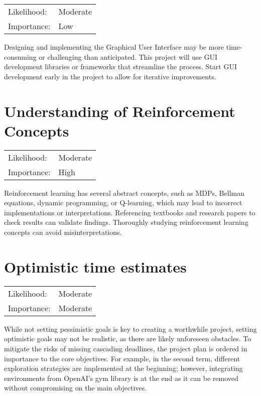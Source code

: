 \documentclass[]{final_report}
\begin{document}
\begin{center}
    \begin{tabular}{l l  }
    Likelihood: & Moderate \\
    Importance: & Low \\
    \end{tabular}
  \end{center}

Designing and implementing the Graphical User Interface may be more time-consuming or challenging than anticipated. This project will use GUI development libraries or frameworks that streamline the process. Start GUI development early in the project to allow for iterative improvements.

\section{Understanding of Reinforcement Concepts}

\begin{center}
    \begin{tabular}{l l  }
    Likelihood: & Moderate \\
    Importance: & High \\
    \end{tabular}
  \end{center}

Reinforcement learning has several abstract concepts, such as MDPs, Bellman equations, dynamic programming, or Q-learning, which may lead to incorrect implementations or interpretations. Referencing textbooks and research papers to check results can validate findings. Thoroughly studying reinforcement learning concepts can avoid misinterpretations.

\section{Optimistic time estimates}

\begin{center}
    \begin{tabular}{l l }
    Likelihood: & Moderate \\
    Importance: & Moderate \\
    \end{tabular}
  \end{center}

While not setting pessimistic goals is key to creating a worthwhile project, setting optimistic goals may not be realistic, as there are likely unforeseen obstacles. To mitigate the risks of missing cascading deadlines, the project plan is ordered in importance to the core objectives. For example, in the second term, different exploration strategies are implemented at the beginning; however, integrating environments from OpenAI's gym library\cite{gym} is at the end as it can be removed without compromising on the main objectives.
\end{document}
